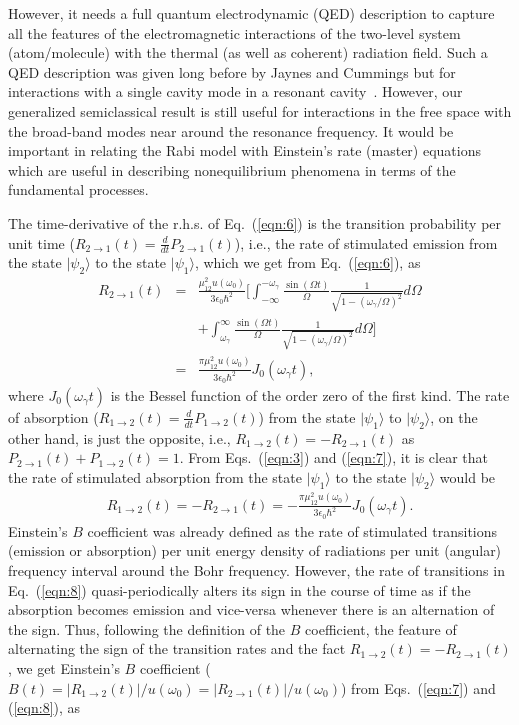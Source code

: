 \documentclass[aps,pra,twocolumn,showpacs,preprintnumbers,amsmath,amssymb,footinbib]{revtex4}
\begin{document}
However, it needs a full quantum electrodynamic (QED) description to capture all the features of the electromagnetic interactions of the two-level system (atom/molecule) with the thermal (as well as coherent) radiation field. Such a QED description was given long before by Jaynes and Cummings but for interactions with a single cavity mode in a resonant cavity~\cite{Jaynes}. However, our generalized semiclassical result is still useful for interactions in the free space with the broad-band modes near around the resonance frequency. It would be important in relating the Rabi model with Einstein's rate (master) equations which are useful in describing nonequilibrium phenomena in terms of the fundamental processes.

The time-derivative of the r.h.s. of Eq.~(\ref{eqn:6}) is the transition probability per unit time ($R_{2\rightarrow1}(t)=\frac{d}{d t}P_{2\rightarrow1}(t)$), i.e., the rate of stimulated emission from the state $|\psi_2\rangle$ to the state $|\psi_1\rangle$, which we get from Eq.~(\ref{eqn:6}), as
\begin{eqnarray}\label{eqn:7}
R_{2\rightarrow1}(t)&=&\frac{\mu_{12}^2u(\omega_0)}{3\epsilon_0\hbar^2}\bigg[\int_{-\infty}^{-\omega_\gamma}\frac{\sin(\Omega t)}{\Omega}\frac{1}{\sqrt{1-(\omega_\gamma/\Omega)^2}}d\Omega\nonumber\\&&+\int_{\omega_\gamma}^\infty\frac{\sin(\Omega t)}{\Omega}\frac{1}{\sqrt{1-(\omega_\gamma/\Omega)^2}}d\Omega\bigg]\nonumber\\&=&\frac{\pi\mu_{12}^2u(\omega_0)}{3\epsilon_0\hbar^2}J_0(\omega_\gamma t),
\end{eqnarray}
where $J_0(\omega_\gamma t)$ is the Bessel function of the order zero of the first kind. The rate of absorption ($R_{1\rightarrow2}(t)=\frac{d}{d t}P_{1\rightarrow2}(t)$) from the state $|\psi_1\rangle$ to $|\psi_2\rangle$, on the other hand, is just the opposite, i.e., $R_{1\rightarrow2}(t)=-R_{2\rightarrow1}(t)$ as $P_{2\rightarrow1}(t)+P_{1\rightarrow2}(t)=1$. From Eqs.~(\ref{eqn:3}) and (\ref{eqn:7}), it is clear that the rate of stimulated absorption from the state $|\psi_1\rangle$ to the state $|\psi_2\rangle$ would be
\begin{eqnarray}\label{eqn:8}
R_{1\rightarrow2}(t)=-R_{2\rightarrow1}(t)=-\frac{\pi\mu_{12}^2u(\omega_0)}{3\epsilon_0\hbar^2}J_0(\omega_\gamma t).
\end{eqnarray}
Einstein's $B$ coefficient was already defined as the rate of stimulated transitions (emission or absorption) per unit energy density of radiations per unit (angular) frequency interval around the Bohr frequency. However, the rate of transitions in Eq.~(\ref{eqn:8}) quasi-periodically alters its sign in the course of time as if the absorption becomes emission and vice-versa whenever there is an alternation of the sign. Thus, following the definition of the $B$ coefficient, the feature of alternating the sign of the transition rates and the fact $R_{1\rightarrow2}(t)=-R_{2\rightarrow1}(t)$, we get Einstein's $B$ coefficient ($B(t)=|R_{1\rightarrow2}(t)|/u(\omega_0)=|R_{2\rightarrow1}(t)|/u(\omega_0)$) from Eqs.~(\ref{eqn:7}) and (\ref{eqn:8}), as
\end{document}

